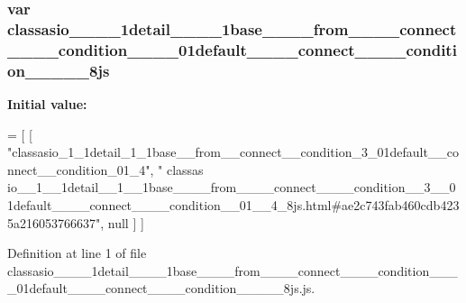 \subsubsection[{classasio\+\_\+\+\_\+1\+\_\+\+\_\+1detail\+\_\+\+\_\+1\+\_\+\+\_\+1base\+\_\+\+\_\+\+\_\+\+\_\+from\+\_\+\+\_\+\+\_\+\+\_\+connect\+\_\+\+\_\+\+\_\+\+\_\+condition\+\_\+\+\_\+3\+\_\+\+\_\+01default\+\_\+\+\_\+\+\_\+\+\_\+connect\+\_\+\+\_\+\+\_\+\+\_\+condition\+\_\+\+\_\+01\+\_\+\+\_\+4\+\_\+8js}]{\setlength{\rightskip}{0pt plus 5cm}var classasio\+\_\+\+\_\+\_\+\+\_\+1detail\+\_\+\+\_\+\_\+\+\_\+1base\+\_\+\+\_\+\+\_\+\+\_\+from\+\_\+\+\_\+\+\_\+\+\_\+connect\+\_\+\+\_\+\+\_\+\+\_\+condition\+\_\+\+\_\+\_\+\+\_\+01default\+\_\+\+\_\+\+\_\+\+\_\+connect\+\_\+\+\_\+\+\_\+\+\_\+condition\+\_\+\+\_\+\_\+\+\_\+\_\+8js}\label{classasio____1____1detail____1____1base________from________connect________condition____3____01de7f706a6f5d532612a9f089ab862a4d05_a18222bf4ca9f3e100d11c0ac11ffd9c1}
{\bfseries Initial value\+:}
\begin{DoxyCode}
=
[
    [ \textcolor{stringliteral}{"classasio\_1\_1detail\_1\_1base\_\_from\_\_connect\_\_condition\_3\_01default\_\_connect\_\_condition\_01\_4"}, \textcolor{stringliteral}{"
      classas
      io\_\_1\_\_1detail\_\_1\_\_1base\_\_\_\_from\_\_\_\_connect\_\_\_\_condition\_\_3\_\_01default\_\_\_\_connect\_\_\_\_condition\_\_01\_\_4\_8js.html#ae2c743fab460cdb4235a216053766637"}, null ]
]
\end{DoxyCode}


Definition at line 1 of file classasio\+\_\+\+\_\+\_\+\+\_\+1detail\+\_\+\+\_\+\_\+\+\_\+1base\+\_\+\+\_\+\+\_\+\+\_\+from\+\_\+\+\_\+\+\_\+\+\_\+connect\+\_\+\+\_\+\+\_\+\+\_\+condition\+\_\+\+\_\+\_\+\+\_\+01default\+\_\+\+\_\+\+\_\+\+\_\+connect\+\_\+\+\_\+\+\_\+\+\_\+condition\+\_\+\+\_\+\_\+\+\_\+\_\+8js.\+js.

